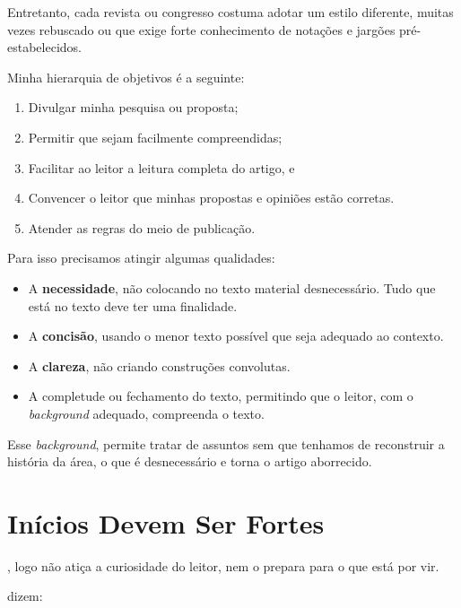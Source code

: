 \documentclass[openany]{book}
\begin{document}
 Entretanto, cada revista ou congresso costuma adotar um estilo diferente, muitas vezes  rebuscado ou que exige forte conhecimento de notações e jargões pré-estabelecidos.

Minha hierarquia de objetivos é a seguinte:
\begin{enumerate}
    \item Divulgar minha pesquisa ou proposta;
    \item Permitir que sejam facilmente compreendidas;
    \item Facilitar ao leitor a leitura completa do artigo, e
    \item Convencer o leitor que minhas propostas e opiniões estão corretas.
    \item Atender as regras do meio de publicação.
\end{enumerate}

Para isso precisamos atingir algumas qualidades:
\begin{itemize}
    \item A \textbf{necessidade}, não colocando no texto material desnecessário. Tudo que está no texto deve ter uma finalidade.
    \item A \textbf{concisão}, usando o menor texto possível que seja adequado ao contexto.
    \item A \textbf{clareza}, não criando construções convolutas.
    \item A completude ou fechamento do texto, permitindo que o leitor, com o \textit{background} adequado, compreenda o texto.
\end{itemize}

 Esse \textit{background}, permite tratar de assuntos sem que tenhamos de reconstruir a história da área, o que é desnecessário e torna o artigo aborrecido.


\chapter{Inícios Devem Ser Fortes}

, logo não atiça a curiosidade do leitor, nem o prepara para o que está por vir.

\citeauthor{Knuth:1997} dizem:
\end{document}
